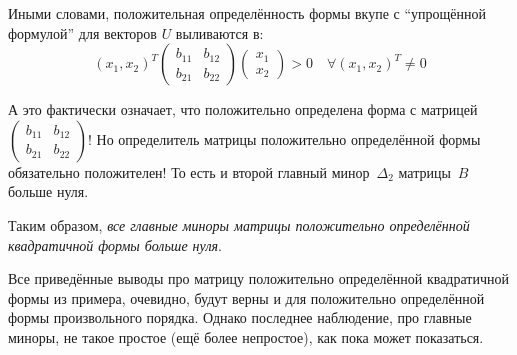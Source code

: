 \documentclass[a4paper,12pt]{article}
\begin{document}
\begin{example}
    Иными словами, положительная определённость формы вкупе с ``упрощённой формулой'' для векторов $U$ выливаются в:
    \[
      (x_1, x_2)^T \begin{pmatrix}
        b_{11} & b_{12}\\
        b_{21} & b_{22}
      \end{pmatrix} \begin{pmatrix}
        x_1\\
        x_2
      \end{pmatrix} > 0\quad \forall (x_1, x_2)^T \not= 0
    \]
    
    А это фактически означает, что положительно определена форма с матрицей $\left(\begin{smallmatrix}
      b_{11} & b_{12}\\
      b_{21} & b_{22}
    \end{smallmatrix}\right)$!
    Но определитель матрицы положительно определённой формы обязательно положителен!
    То есть и второй главный минор~$\Delta_2$ матрицы~$B$ больше нуля.
    
    Таким образом, \emph{все главные миноры матрицы положительно определённой квадратичной формы больше нуля}.
  \end{example}
  
  Все приведённые выводы про матрицу положительно определённой квадратичной формы из примера, очевидно, будут верны и для положительно определённой формы произвольного порядка.
  Однако последнее наблюдение, про главные миноры, не такое простое (ещё более непростое), как пока может показаться.
  
\end{document}
